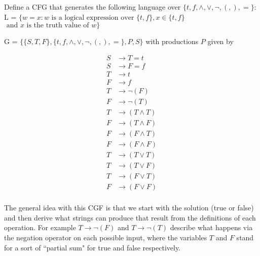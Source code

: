 \documentclass[12pt]{jhwhw}
\begin{document}
\problem{}

	Define a CFG that generates the following language over $\{t,f,\wedge,\vee,\neg,(,),=\}$: \\
	L = $\{w=x : w \text{ is a logical expression over } \{t,f\}, x\in \{t,f\}$
	$\text{ and } x \text{ is the truth value of } w\}$

\solution

	G = $\{\{S,T,F\}, \{t,f,\wedge,\vee,\neg,(,),=\}, P, S\}$ with productions $P$ given by

	\begin{align*}
		S &\rightarrow T=t \\
		S &\rightarrow F=f \\
		T &\rightarrow t \\
		F &\rightarrow f \\
		T &\rightarrow \neg(F) \\
		F &\rightarrow \neg(T) \\
		T &\rightarrow (T \wedge T) \\
		F &\rightarrow (T \wedge F) \\
		F &\rightarrow (F \wedge T) \\
		F &\rightarrow (F \wedge F) \\
		T &\rightarrow (T \vee T) \\
		T &\rightarrow (T \vee F) \\
		T &\rightarrow (F \vee T) \\
		F &\rightarrow (F \vee F) \\
	\end{align*}

	The general idea with this CGF is that we start with the solution (true or false) and
	then derive what strings can produce that result from the definitions of each operation.
	For example $T\rightarrow \neg(F)$ and $T\rightarrow \neg(T)$ describe what happens
	via the negation operator on each possible input, where the variables $T$ and $F$ stand
	for a sort of ``partial sum" for true and false respectively.
\end{document}

